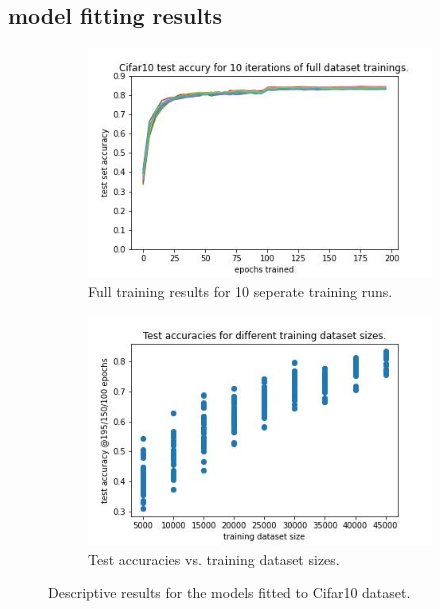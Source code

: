 \documentclass{article} %
\begin{document}
\subsection{model fitting results}
     


\begin{figure}
    \begin{subfigure}{.5\textwidth}
      \centering
      \includegraphics[width=.8\linewidth]{Cifar10_full_dataset_acc_vs_epoch}
      \caption{Full training results for 10 seperate training runs.}
      \label{fig_full_dataset_epoch_vs_acc}
    \end{subfigure}%
    \begin{subfigure}{.5\textwidth}
      \centering
      \includegraphics[width=.8\linewidth]{Cifar10_training_datasetsize_vs_test_acc}
      \caption{Test accuracies vs. training dataset sizes.}
      \label{fig_traing_subset_size_vs_test_acc}
    \end{subfigure}
  
    \caption{Descriptive results for the models fitted to Cifar10 dataset.}
    \label{fig:desc_plots_cifar10}
\end{figure}
\end{document}
